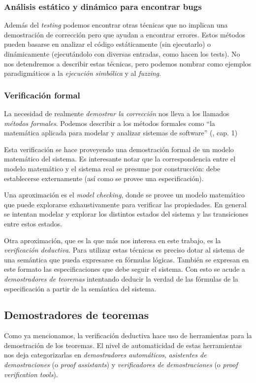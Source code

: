 \documentclass[11pt]{article} %
\begin{document}
\subsubsection{Análisis estático y dinámico para encontrar bugs}
Además del \textit{testing} podemos encontrar otras técnicas que no implican una demostración de corrección pero que ayudan a encontrar errores. Estos métodos pueden basarse en analizar el código estáticamente (sin ejecutarlo) o dinámicamente (ejecutándolo con diversas entradas, como hacen los tests). No nos detendremos a describir estas técnicas, pero podemos nombrar como ejemplos paradigmáticos a la \textit{ejecución simbólica} y al \textit{fuzzing}.

\subsubsection{Verificación formal}
La necesidad de realmente \textit{demostrar la corrección} nos lleva a los llamados \textit{métodos formales}. Podemos describir a los métodos formales como ``la matemática aplicada para modelar y analizar sistemas de software'' (\cite{baier2008principles}, cap. 1)

Esta verificación se hace proveyendo una demostración formal de un modelo matemático del sistema. Es interesante notar que la correspondencia entre el modelo matemático y el sistema real se presume por construcción: debe establecerse externamente (así como se provee una especificación). 

Una aproximación es el \textit{model checking}, donde se provee un modelo matemático que puede explorarse exhaustivamente para verificar las propiedades. En general se intentan modelar y explorar los distintos estados del sistema y las transiciones entre estos estados. 

Otra aproximación, que es la que más nos interesa en este trabajo, es la \textit{verificación deductiva}. Para utilizar estas técnicas es preciso dotar al sistema de una semántica que pueda expresarse en fórmulas lógicas. También se expresan en este formato las especificaciones que debe seguir el sistema. Con esto se acude a \textit{demostradores de teoremas} intentando deducir la verdad de las fórmulas de la especificación a partir de la semántica del sistema. 

\subsection{Demostradores de teoremas}
Como ya mencionamos, la verificación deductiva hace uso de herramientas para la demostración de los teoremas. El nivel de automaticidad de estas herramientas nos deja categorizarlas en \textit{demostradores automáticos}, \textit{asistentes de demostraciones} (o \textit{proof assistants}) y \textit{verificadores de demostraciones} (o \textit{proof verification tools}).
\end{document}
